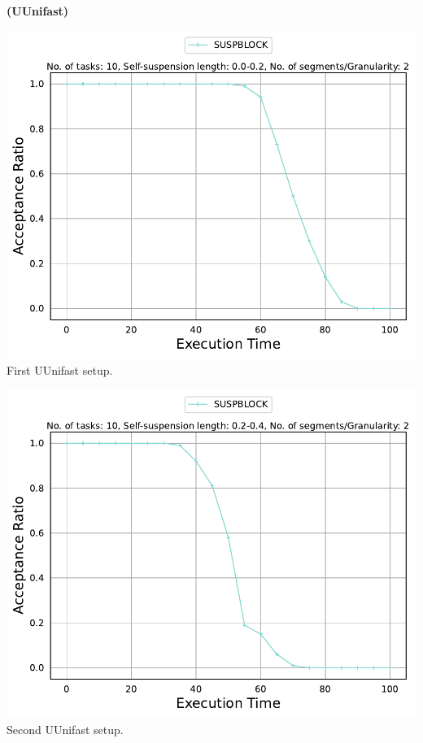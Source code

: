 \documentclass[]{article}
\begin{document}
	\begin{minipage}[t]{0.48\linewidth}
		\centering
		\textbf{(UUnifast)}
		\vspace{0.3cm}
		
		\includegraphics[width=\linewidth]{SUSPBLOCK[2][0.0-0.2][10].pdf}
		First UUnifast setup.
		\vspace{0.3cm}
		
		\includegraphics[width=\linewidth]{SUSPBLOCK[2][0.2-0.4][10].pdf}
		Second UUnifast setup.
		\vspace{0.3cm}
		

\end{minipage}
\end{document}
